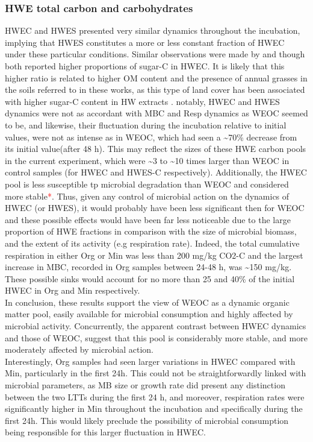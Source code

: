 \documentclass[12pt]{report}
\newcommand{\myRed}[1]{\textcolor{red}{#1}} %
\begin{document}
 		\subsubsection{HWE total carbon and carbohydrates}
			
			HWEC and HWES presented very similar dynamics throughout the incubation, implying that HWES constitutes  a more or less constant fraction of HWEC under these particular conditions. Similar observations were made by \citet{haynes2005} and \citet{ghani2000, ghani2003} though both reported higher proportions of sugar-C in HWEC. It is likely that this higher ratio is related to higher OM content and the presence of annual grasses in the soils referred to in these works, as this type of land cover has been associated with higher sugar-C content in HW extracts \citep{haynes1993}.
			notably, HWEC and HWES dynamics were not as accordant with MBC and Resp dynamics as WEOC seemed to be, and likewise, their fluctuation during the incubation relative to initial values, were not as intense as in WEOC, which had seen a \~{}70\% decrease from its initial value(after 48 h). This may reflect the sizes of these HWE carbon pools in the current experiment, which were \~{}3 to \~{}10 times larger than WEOC in control samples (for HWEC and HWES-C respectively). Additionally, the HWEC pool is less susceptible tp microbial degradation than WEOC and  considered more stable\myRed{*}. Thus, given any control of microbial action on the dynamics of HWEC (or HWES), it would probably have been less significant then for WEOC and these possible effects would have been far less noticeable due to the large proportion of HWE fractions in comparison with the size of microbial biomass, and the extent of its activity (e.g respiration rate). Indeed, the total cumulative respiration  in either Org or Min was less than 200 mg/kg CO2-C and the largest increase in MBC, recorded in Org samples between 24-48 h, was \~{}150 mg/kg. These possible sinks would account for no more than 25 and 40\% of the initial HWEC in Org and Min respectively. \\
			In conclusion, these results support the view of WEOC as a dynamic organic matter pool, easily available for microbial consumption and highly affected by microbial activity. Concurrently, the apparent contrast between HWEC dynamics and those of WEOC, suggest that this pool is considerably more stable, and more moderately affected by microbial action.\\
			Interestingly, Org samples had seen larger variations in HWEC compared with Min, particularly in the first 24h. This could not be straightforwardly linked with microbial parameters, as MB size or growth rate did present any distinction between the two LTTs during the first 24 h, and moreover, respiration rates were significantly higher in Min throughout the incubation and specifically during the first 24h. This would likely preclude the possibility of microbial consumption being responsible for this larger fluctuation in HWEC.
			
\end{document}
